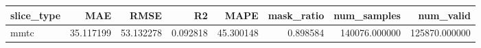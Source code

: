 \begin{tabular}{lrrrrrrr}
\toprule
slice_type & MAE & RMSE & R2 & MAPE & mask_ratio & num_samples & num_valid \\
\midrule
mmtc & 35.117199 & 53.132278 & 0.092818 & 45.300148 & 0.898584 & 140076.000000 & 125870.000000 \\
\bottomrule
\end{tabular}
